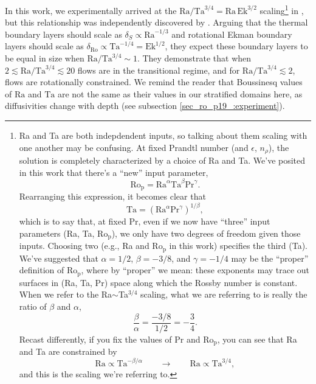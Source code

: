 In this work, we experimentally arrived at the 
$\text{Ra}/\text{Ta}^{3/4} = \text{Ra}\,\text{Ek}^{3/2}$
scaling\footnote{
Ra and Ta are both indepdendent inputs, so talking about them scaling with one another may be confusing.
At fixed Prandtl number (and $\epsilon$, $n_\rho$), the solution is completely characterized by a choice of Ra and Ta.
We've posited in this work that there's a ``new'' input parameter,
\begin{equation}
\text{Ro}_\text{p} = \text{Ra}^\alpha\text{Ta}^\beta\text{Pr}^{\gamma}.
\end{equation}
Rearranging this expression, it becomes clear that
\begin{equation}
\text{Ta} = \left(\text{Ra}^\alpha\text{Pr}^{\gamma}\right)^{1/\beta},
\end{equation}
which is to say that, at fixed Pr, even if we now have ``three'' input parameters (Ra, Ta, Ro$_{\text{p}}$), we only have two degrees of freedom given those inputs.
Choosing two (e.g., Ra and Ro$_\text{p}$ in this work) specifies the third (Ta).
We've suggested that $\alpha = 1/2$, $\beta = -3/8$, and $\gamma = -1/4$ may be the ``proper'' definition of Ro$_{\text{p}}$, where by ``proper'' we mean: these exponents may trace out surfaces in (Ra, Ta, Pr) space along which the Rossby number is constant.
When we refer to the Ra$\sim$Ta$^{3/4}$ scaling, what we are referring to is really the ratio of $\beta$ and $\alpha$,
$$
\frac{\beta}{\alpha} = \frac{-3/8}{1/2} = -\frac{3}{4}.
$$
Recast differently, if you fix the values of Pr and Ro$_{\text{p}}$, you can see that Ra and Ta are constrained by
$$
\text{Ra} \propto \text{Ta}^{-\beta/\alpha} \qquad\rightarrow\qquad
\text{Ra} \propto \text{Ta}^{3/4},
$$
and this is the scaling we're referring to.
} in \pro, but this relationship was independently
discovered by \cite{king&all2012}. Arguing that the thermal boundary layers should
scale as $\delta_{S} \propto \text{Ra}^{-1/3}$ and rotational Ekman boundary layers
should scale as $\delta_{\text{Ro}} \propto \text{Ta}^{-1/4} = \text{Ek}^{1/2}$, they
expect these boundary layers to be equal in size when $\text{Ra}/\text{Ta}^{3/4} \sim 1$.
They demonstrate that when $2 \lesssim\text{Ra}/\text{Ta}^{3/4} \lesssim 20$ flows are in the
transitional regime, and for $\text{Ra}/\text{Ta}^{3/4} \lesssim 2$, flows are rotationally
constrained. We remind the reader that Boussinesq values of $\text{Ra}$ and $\text{Ta}$ are 
not the same as their
values in our stratified domains here, as diffusivities change with depth (see subsection \ref{sec_ro_p19_:experiment}). 
